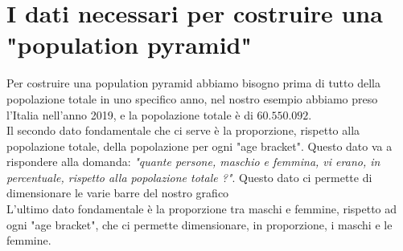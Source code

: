 \documentclass[11pt, oneside]{article}   	%
\begin{document}
\section{I dati necessari per costruire una "population pyramid"}
Per costruire una population pyramid abbiamo bisogno prima di tutto della popolazione totale in uno specifico anno, nel nostro esempio abbiamo preso l'Italia nell'anno 2019, e la popolazione totale è di $60.550.092$. \\
Il secondo dato fondamentale che ci serve è la proporzione, rispetto alla popolazione totale, della popolazione per ogni "age bracket". Questo dato va a rispondere alla domanda: \emph{"quante persone, maschio e femmina, vi erano, in percentuale, rispetto alla popolazione totale ?"}. Questo dato ci permette di dimensionare le varie barre del nostro grafico\\
L'ultimo dato fondamentale è la proporzione tra maschi e femmine, rispetto ad ogni "age bracket", che ci permette dimensionare, in proporzione, i maschi e le femmine.
\end{document}
